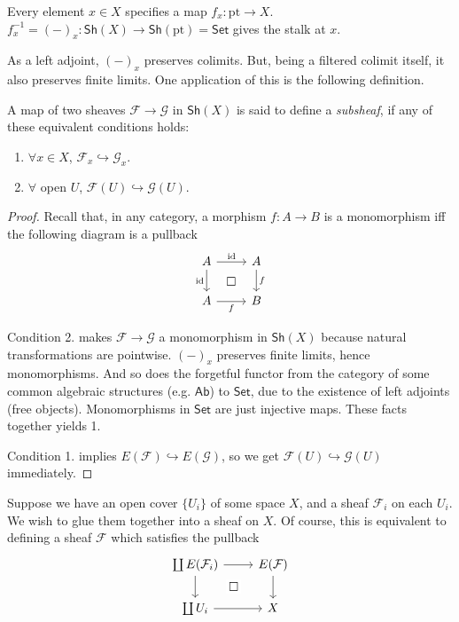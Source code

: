 \begin{example}
    Every element $x\in X$ specifies a map $f_x:\mathrm{pt}\to X$. $f_x^{-1}=(-)_x:\mathsf{Sh}(X)\to\mathsf{Sh}(\mathrm{pt})=\mathsf{Set}$ gives the stalk at $x$.
\end{example}

As a left adjoint, $(-)_x$ preserves colimits. But, being a filtered colimit itself, it also preserves finite limits. One application of this is the following definition.

\begin{proposition}
    A map of two sheaves $\mathcal{F}\to\mathcal{G}$ in $\mathsf{Sh}(X)$ is said to define a \emph{subsheaf}, if any of these equivalent conditions holds:
    \begin{enumerate}
        \item $\forall x\in X$, $\mathcal{F}_x\hookrightarrow\mathcal{G}_x$.
        \item $\forall$ open $U$, $\mathcal{F}(U)\hookrightarrow\mathcal{G}(U)$.
    \end{enumerate}
\end{proposition}

\begin{proof}
    Recall that, in any category, a morphism $f:A\to B$ is a monomorphism iff the following diagram is a pullback
    \[ \begin{tikzcd}
            A \arrow[r, "\text{id}"] \arrow[d, "\text{id}"'] \arrow[rd, "\Box" description, phantom, pos=0.5] & A \arrow[d, "f"] \\
            A \arrow[r, "f"'] & B 
        \end{tikzcd} \]

    Condition 2. makes $\mathcal{F}\to\mathcal{G}$ a monomorphism in $\mathsf{Sh}(X)$ because natural transformations are pointwise. $(-)_x$ preserves finite limits, hence monomorphisms. And so does the forgetful functor from the category of some common algebraic structures (e.g. $\mathsf{Ab}$) to $\mathsf{Set}$, due to the existence of left adjoints (free objects). Monomorphisms in $\mathsf{Set}$ are just injective maps. These facts together yields 1.

    Condition 1. implies $E(\mathcal{F})\hookrightarrow E(\mathcal{G})$, so we get $\mathcal{F}(U)\hookrightarrow\mathcal{G}(U)$ immediately.
\end{proof}

Suppose we have an open cover $\{U_i\}$ of some space $X$, and a sheaf $\mathcal{F}_i$ on each $U_i$. We wish to glue them together into a sheaf on $X$. Of course, this is equivalent to defining a sheaf $\mathcal{F}$ which satisfies the pullback
\[ \begin{tikzcd}
    \coprod E(\mathcal{F}_i) \arrow[r] \arrow[d] \arrow[rd, "\Box" description, phantom, pos=0.4] & E(\mathcal{F}) \arrow[d] \\
    \coprod U_i \arrow[r] & X
\end{tikzcd} \]

